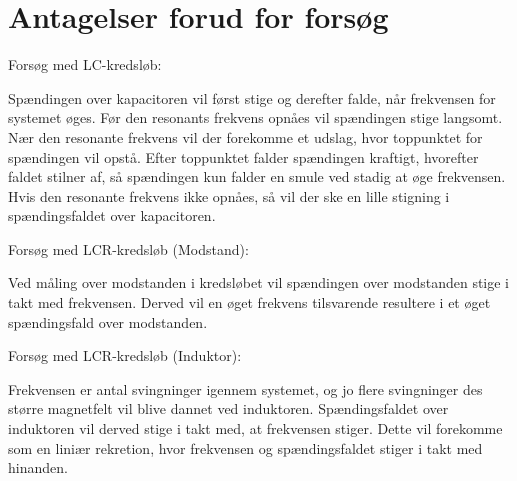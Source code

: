 \section{Antagelser forud for forsøg}

Forsøg med LC-kredsløb:

Spændingen over kapacitoren vil først stige og derefter falde, når frekvensen for systemet øges. Før den resonants frekvens opnåes vil spændingen stige langsomt. Nær den resonante frekvens vil der forekomme et udslag, hvor toppunktet for spændingen vil opstå. Efter toppunktet falder spændingen kraftigt, hvorefter faldet stilner af, så spændingen kun falder en smule ved stadig at øge frekvensen. Hvis den resonante frekvens ikke opnåes, så vil der ske en lille stigning i spændingsfaldet over kapacitoren.

Forsøg med LCR-kredsløb (Modstand):

Ved måling over modstanden i kredsløbet vil spændingen over modstanden stige i takt med frekvensen. Derved vil en øget frekvens tilsvarende resultere i et øget spændingsfald over modstanden.

Forsøg med LCR-kredsløb (Induktor):

Frekvensen er antal svingninger igennem systemet, og jo flere svingninger des større magnetfelt vil blive dannet ved induktoren. Spændingsfaldet over induktoren vil derved stige i takt med, at frekvensen stiger. Dette vil forekomme som en liniær rekretion, hvor frekvensen og spændingsfaldet stiger i takt med hinanden.